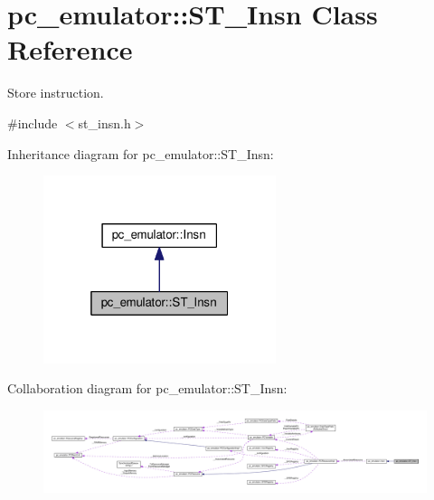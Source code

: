 \hypertarget{classpc__emulator_1_1ST__Insn}{}\section{pc\+\_\+emulator\+:\+:S\+T\+\_\+\+Insn Class Reference}
\label{classpc__emulator_1_1ST__Insn}


Store instruction.  




{\ttfamily \#include $<$st\+\_\+insn.\+h$>$}



Inheritance diagram for pc\+\_\+emulator\+:\+:S\+T\+\_\+\+Insn\+:\nopagebreak
\begin{figure}[H]
\begin{center}
\leavevmode
\includegraphics[width=193pt]{classpc__emulator_1_1ST__Insn__inherit__graph}
\end{center}
\end{figure}


Collaboration diagram for pc\+\_\+emulator\+:\+:S\+T\+\_\+\+Insn\+:\nopagebreak
\begin{figure}[H]
\begin{center}
\leavevmode
\includegraphics[width=350pt]{classpc__emulator_1_1ST__Insn__coll__graph}
\end{center}
\end{figure}

